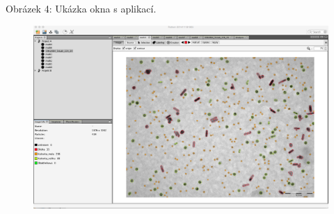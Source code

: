 \documentclass[11pt,twoside,a4paper,table]{book}
\begin{document}
\noindent Obrázek 4: Ukázka okna s aplikací.
\begin{figure}
	\centering
	\includegraphics[scale=0.3, angle = 90]{figures/app_screen_image_info}
\end{figure}
\end{document}
